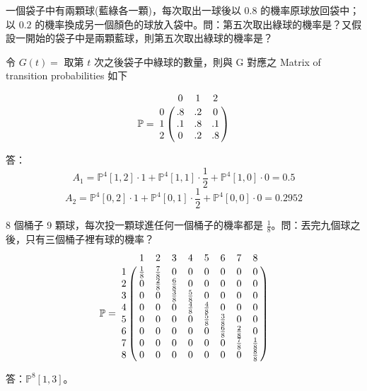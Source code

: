 \begin{example} 
一個袋子中有兩顆球(藍綠各一顆)，每次取出一球後以 $0.8$ 的機率原球放回袋中；以 $0.2$ 的機率換成另一個顏色的球放入袋中。問：第五次取出綠球的機率是？又假設一開始的袋子中是兩顆藍球，則第五次取出綠球的機率是？

令 $G(t) =$ 取第 $t$ 次之後袋子中綠球的數量，則與 G 對應之 Matrix of transition probabilities 如下
\begin{multicols}{2}
\[ \mathbb{P} = \bordermatrix{
    &  0 & 1  &  2 \cr
  0 & .8 & .2 &  0 \cr
  1 & .1 & .8 & .1 \cr
  2 &  0 & .2 & .8 
} \]
\null \vfill
\null \vfill
{}
\end{multicols}

答：
\[A_1 = \mathbb{P}^4[1,2] \cdot 1 + \mathbb{P}^4[1,1] \cdot \frac{1}{2} + \mathbb{P}^4[1,0] \cdot 0 = 0.5\]
\[A_2 = \mathbb{P}^4[0,2] \cdot 1 + \mathbb{P}^4[0,1] \cdot \frac{1}{2} + \mathbb{P}^4[0,0] \cdot 0 = 0.2952\]
\end{example}

\begin{question} \label{q:balls}
8 個桶子 9 顆球，每次投一顆球進任何一個桶子的機率都是 $ \frac{1}{8} $。問：丟完九個球之後，只有三個桶子裡有球的機率？
\[ \mathbb{P} = \bordermatrix{
    & 1 & 2 & 3 & 4 & 5 & 6 & 7 & 8 \cr
  1 & \frac{1}{8} & \frac{7}{8} & 0 & 0 & 0 & 0 & 0 & 0 \cr
  2 & 0 & \frac{2}{8} & \frac{6}{8} & 0 & 0 & 0 & 0 & 0 \cr
  3 & 0 & 0 & \frac{3}{8} & \frac{5}{8} & 0 & 0 & 0 & 0 \cr
  4 & 0 & 0 & 0 & \frac{4}{8} & \frac{4}{8} & 0 & 0 & 0 \cr
  5 & 0 & 0 & 0 & 0 & \frac{5}{8} & \frac{3}{8} & 0 & 0 \cr
  6 & 0 & 0 & 0 & 0 & 0 & \frac{6}{8} & \frac{2}{8} & 0 \cr
  7 & 0 & 0 & 0 & 0 & 0 & 0 & \frac{7}{8} & \frac{1}{8} \cr
  8 & 0 & 0 & 0 & 0 & 0 & 0 & 0 & \frac{8}{8}
} \]
\begin{figure}[htp]
\centering
{}
\end{figure}

答：$ \mathbb{P}^{8} [1, 3] $。
\end{question}

